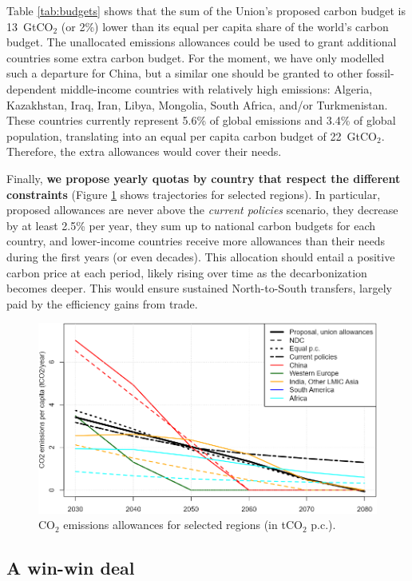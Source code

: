 \documentclass[12pt,english]{article}
\begin{document}
Table \ref{tab:budgets} shows that the sum of the Union's proposed carbon budget is 13~GtCO$_\text{2}$ (or 2\%) lower than its equal per capita share of the world's carbon budget. The unallocated emissions allowances could be used to grant additional countries some extra carbon budget. For the moment, we have only modelled such a departure for China, but a similar one should be granted to other fossil-dependent middle-income countries with relatively high emissions: Algeria, Kazakhstan, Iraq, Iran, Libya, Mongolia, South Africa, and/or Turkmenistan. These countries currently represent 5.6\% of global emissions and 3.4\% of global population, translating into an equal per capita carbon budget of 22~GtCO$_\text{2}$. Therefore, the extra allowances would cover their needs. 

Finally, \textbf{we propose yearly quotas by country that respect the different constraints} (Figure \ref{fig:trajectories} shows trajectories for selected regions). %
In particular, proposed allowances are never above the \textit{current policies} scenario, they decrease by at least 2.5\% per year, they sum up to national carbon budgets for each country, and lower-income countries receive more allowances than their needs during the first years (or even decades). This allocation should entail a positive carbon price at each period, likely rising over time as the decarbonization becomes deeper. This would ensure sustained North-to-South transfers, largely paid by the efficiency gains from trade.

\begin{figure}[h]
  \centering \caption{CO$_\text{2}$ emissions allowances for selected regions (in tCO$_\text{2}$ p.c.).\label{fig:trajectories}}
  \includegraphics[width=.7\textwidth]{../figures/policies/fossil_free_union_emission_trajectories.png} 
\end{figure}

\subsection{A win-win deal\label{subsec:winwin}}
\end{document}
